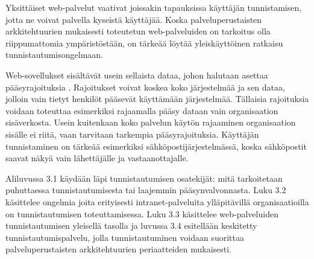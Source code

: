 Yksittäiset web-palvelut vaativat joissakin tapauksissa käyttäjän tunnistamisen, jotta ne voivat palvella kyseistä käyttäjää. Koska palveluperustaisten arkkitehtuurien mukaisesti toteutetun web-palveluiden on tarkoitus olla riippumattomia ympäristöstään, on tärkeää löytää yleiskäyttöinen ratkaisu tunnistautumisongelmaan.

Web-sovellukset sisältävät usein sellaista dataa, johon halutaan asettaa pääsyrajoituksia \cite{inside_the_identity_management_game}. Rajoitukset voivat koskea koko järjestelmää ja sen dataa, jolloin vain tietyt henkilöt pääsevät käyttämään järjestelmää. Tällaisia rajoituksia voidaan toteuttaa esimerkiksi rajaamalla pääsy dataan vain organisaation sisäverkosta. Usein kuitenkaan koko palvelun käytön rajaaminen organisaation sisälle ei riitä, vaan tarvitaan tarkempia pääsyrajoituksia. Käyttäjän tunnistaminen on tärkeää esimerkiksi sähköpostijärjestelmässä, koska sähköpostit saavat näkyä vain lähettäjälle ja vastaanottajalle.

Aliluvussa 3.1 käydään läpi tunnistautumisen osatekijät: mitä tarkoitetaan puhuttaessa tunnistautumisesta tai laajemmin pääsynvalvonnasta. Luku 3.2 käsittelee ongelmia joita erityisesti intranet-palveluita ylläpitävillä organisaatioilla on tunnistautumisen toteuttamisessa. Luku 3.3 käsittelee web-palveluiden tunnistautumisen yleisellä tasolla ja luvussa 3.4 esitellään keskitetty tunnistautumispalvelu, jolla tunnistautuminen voidaan suorittaa palveluperustaisten arkkitehtuurien periaatteiden mukaisesti.